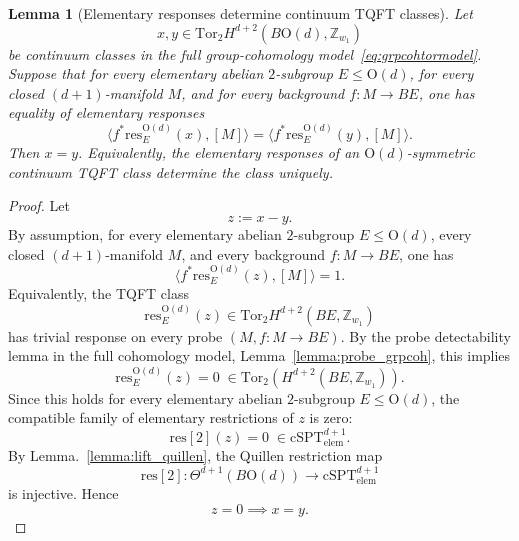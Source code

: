 \documentclass[aps,prx,reprint,superscriptaddress,twocolumn,amsmath,amssymb,amsfonts, nofootinbib]{revtex4-2}
\newcommand{\res}{\text{res}}
\newcommand{\tor}{\text{Tor}}
\newcommand{\Z}{\mathbb{Z}}
\theoremstyle{apsstyle}
\newtheorem{lemma}{Lemma}
\begin{document}
\begin{lemma}[Elementary responses determine continuum TQFT classes]
\label{lemma:elem_response_detect_grpcoh}
Let
\begin{equation*}
x,y\in \tor_{2}H^{d+2}(B\mathrm{O}(d), \Z_{w_{1}})
\end{equation*}
be continuum classes in the full group-cohomology model~\eqref{eq:grpcohtormodel}. Suppose that for every elementary abelian $2$-subgroup $E\leq \mathrm{O}(d)$,
for every closed $(d+1)$-manifold $M$, and for every background $f:M\to BE$, one has equality of elementary responses
\begin{equation*}
\big\langle f^*\res^{\mathrm{O}(d)}_{E}(x),[M]\big\rangle
=
\big\langle f^*\res^{\mathrm{O}(d)}_{E}(y),[M]\big\rangle .
\end{equation*}
Then $x=y$. Equivalently, the elementary responses of an $\mathrm{O}(d)$-symmetric continuum TQFT class determine the class uniquely.
\end{lemma}

\begin{proof}
Let
\begin{equation*}
z:=x-y.
\end{equation*}
By assumption, for every elementary abelian $2$-subgroup $E\leq \mathrm{O}(d)$,
every closed $(d+1)$-manifold $M$, and every background $f:M\to BE$, one has
\begin{equation*}
\big\langle f^*\res^{\mathrm{O}(d)}_{E}(z),[M]\big\rangle=1.
\end{equation*}
Equivalently, the TQFT class
\begin{equation*}
\res^{\mathrm{O}(d)}_{E}(z)\in  \tor_{2}H^{d+2}(BE, \Z_{w_{1}})
\end{equation*}
has trivial response on every probe $(M,f:M\to BE)$. By the probe
detectability lemma in the full cohomology model, Lemma~\ref{lemma:probe_grpcoh},
this implies
\begin{equation*}
\res^{\mathrm{O}(d)}_{E}(z)=0 \; \in  \tor_{2}\left(H^{d+2}(BE, \Z_{w_{1}})\right).
\end{equation*}
Since this holds for every elementary abelian $2$-subgroup $E\leq \mathrm{O}(d)$,
the compatible family of elementary restrictions of $z$ is zero:
\begin{equation*}
\res[2](z)=0\;\in \mathrm{cSPT}^{d+1}_{\mathrm{elem}}.
\end{equation*}
By Lemma.~\ref{lemma:lift_quillen}, the Quillen restriction map
\begin{equation*}
\res[2]:
\Theta^{d+1}(B\mathrm{O}(d))
\longrightarrow
\mathrm{cSPT}^{d+1}_{\mathrm{elem}}
\end{equation*}
is injective. Hence
\begin{equation*}
z=0 \implies  x=y.
\end{equation*}
\end{proof}
\end{document}
